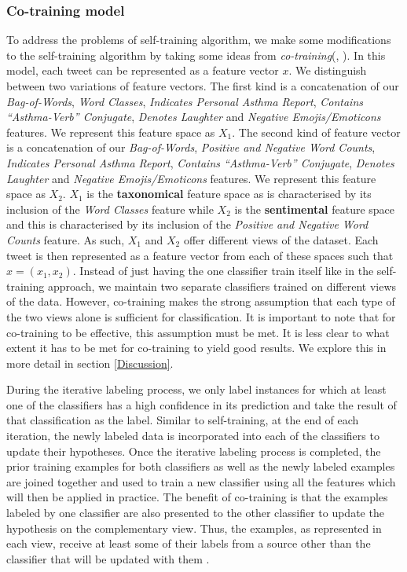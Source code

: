 \documentclass[10pt,letterpaper]{article}
\begin{document}
\subsubsection{Co-training model} \label{learning2}
To address the problems of self-training algorithm, we make some modifications to the self-training algorithm by taking some ideas from \textit{co-training}(\cite{REF25}, \cite{REF26}). In this model, each tweet can be represented as a feature vector $x$. We distinguish between two variations of feature vectors. The first kind is a concatenation of our \textit{Bag-of-Words}, \textit{Word Classes}, \textit{Indicates Personal Asthma Report}, \textit{Contains “Asthma-Verb” Conjugate}, \textit{Denotes Laughter} and \textit{Negative Emojis/Emoticons} features. We represent this feature space as $X_1$. The second kind of feature vector is a concatenation of our \textit{Bag-of-Words}, \textit{Positive and Negative Word Counts}, \textit{Indicates Personal Asthma Report}, \textit{Contains “Asthma-Verb” Conjugate}, \textit{Denotes Laughter} and \textit{Negative Emojis/Emoticons} features. We represent this feature space as $X_2$. $X_1$ is the \textbf{taxonomical} feature space as is characterised by its inclusion of the \textit{Word Classes} feature while $X_2$ is the \textbf{sentimental} feature space and this is characterised by its inclusion of the \textit{Positive and Negative Word Counts} feature. As such, $X_1$ and $X_2$ offer different views of the dataset. Each tweet is then represented as a feature vector from each of these spaces such that $x = (x_1,x_2)$. Instead of just having the one classifier train itself like in the self-training approach, we maintain two separate classifiers trained on different views of the data. However, co-training makes the strong assumption that each type of the two views alone is sufficient for classification. It is important to note that for co-training to be effective, this assumption must be met. It is less clear to what extent it has to be met for co-training to yield good results. We explore this in more detail in section \ref{Discussion}.

During the iterative labeling process, we only label instances for which at least one of the classifiers has a high confidence in its prediction and take the result of that classification as the label. Similar to self-training, at the end of each iteration, the newly labeled data is incorporated into each of the classifiers to update their hypotheses. Once the iterative labeling process is completed, the prior training examples for both classifiers as well as the newly labeled examples are joined together and used to train a new classifier using all the features which will then be applied in practice. The benefit of co-training is that the examples labeled by one classifier are also presented to the other classifier to update the hypothesis on the complementary view. Thus, the examples, as represented in each view, receive at least some of their labels from a source other than the classifier that will be updated with them \cite{REF22}.
\end{document}
